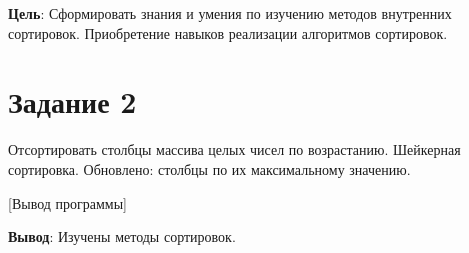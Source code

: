 \documentclass[variant=labwork]{bsuir}
\begin{document}
\maketitle
\mainmatter

\textbf{Цель}: Сформировать знания и умения по изучению методов внутренних
сортировок. Приобретение навыков реализации алгоритмов сортировок.

\section*{Задание 2}

Отсортировать столбцы массива целых чисел по возрастанию. Шейкерная сортировка.
Обновлено: столбцы по их максимальному значению.


[Вывод программы]

\textbf{Вывод}: Изучены методы сортировок.
\end{document}
